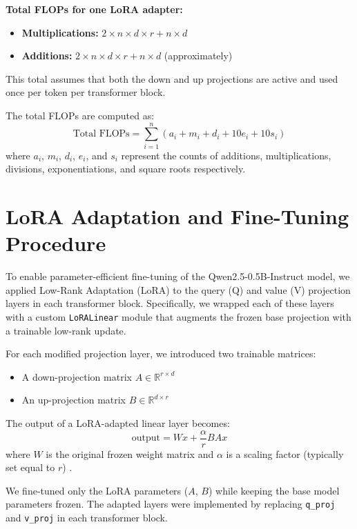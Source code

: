 \documentclass[a4paper,12pt]{article}
\begin{document}
\textbf{Total FLOPs for one LoRA adapter:}
\begin{itemize}
  \item \textbf{Multiplications:} $2 \times n \times d \times r + n \times d$
  \item \textbf{Additions:} $2 \times n \times d \times r + n \times d$ (approximately)
\end{itemize}
This total assumes that both the down and up projections are active and used once per token per transformer block.

The total FLOPs are computed as:
\begin{equation}
\text{Total FLOPs} = \sum_{i=1}^{n} \left( a_i + m_i + d_i + 10e_i + 10s_i \right)
\end{equation}
where $a_i$, $m_i$, $d_i$, $e_i$, and $s_i$ represent the counts of additions, multiplications, divisions, exponentiations, and square roots respectively.

\section{LoRA Adaptation and Fine-Tuning Procedure}

To enable parameter-efficient fine-tuning of the Qwen2.5-0.5B-Instruct model, we applied Low-Rank Adaptation (LoRA) to the query (Q) and value (V) projection layers in each transformer block. Specifically, we wrapped each of these layers with a custom \texttt{LoRALinear} module that augments the frozen base projection with a trainable low-rank update.

For each modified projection layer, we introduced two trainable matrices:
\begin{itemize}
    \item A down-projection matrix $A \in \mathbb{R}^{r \times d}$
    \item An up-projection matrix $B \in \mathbb{R}^{d \times r}$
\end{itemize}

The output of a LoRA-adapted linear layer becomes:
\begin{equation}
\text{output} = W x + \frac{\alpha}{r} B A x
\end{equation}
where $W$ is the original frozen weight matrix and $\alpha$ is a scaling factor (typically set equal to $r$) \citep{hu2021lora}.

We fine-tuned only the LoRA parameters ($A$, $B$) while keeping the base model parameters frozen. The adapted layers were implemented by replacing \texttt{q\_proj} and \texttt{v\_proj} in each transformer block.
\end{document}
